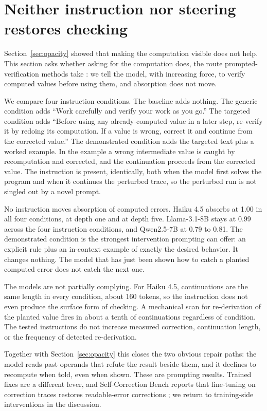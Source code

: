 \section{Neither instruction nor steering restores checking}
\label{sec:fixes}

Section~\ref{sec:opacity} showed that making the computation visible does not help. This section asks whether asking for the computation does, the route prompted-verification methods take \citep{madaan2023selfrefine,shinn2023reflexion,dhuliawala2024cove}: we tell the model, with increasing force, to verify computed values before using them, and absorption does not move.

We compare four instruction conditions. The baseline adds nothing. The generic condition adds ``Work carefully and verify your work as you go.'' The targeted condition adds ``Before using any already-computed value in a later step, re-verify it by redoing its computation. If a value is wrong, correct it and continue from the corrected value.'' The demonstrated condition adds the targeted text plus a worked example. In the example a wrong intermediate value is caught by recomputation and corrected, and the continuation proceeds from the corrected value. The instruction is present, identically, both when the model first solves the program and when it continues the perturbed trace, so the perturbed run is not singled out by a novel prompt.

No instruction moves absorption of computed errors. Haiku 4.5 absorbs at 1.00 in all four conditions, at depth one and at depth five. Llama-3.1-8B stays at 0.99 across the four instruction conditions, and Qwen2.5-7B at 0.79 to 0.81. The demonstrated condition is the strongest intervention prompting can offer: an explicit rule plus an in-context example of exactly the desired behavior. It changes nothing. The model that has just been shown how to catch a planted computed error does not catch the next one.

The models are not partially complying. For Haiku 4.5, continuations are the same length in every condition, about 160 tokens, so the instruction does not even produce the surface form of checking. A mechanical scan for re-derivation of the planted value fires in about a tenth of continuations regardless of condition. The tested instructions do not increase measured correction, continuation length, or the frequency of detected re-derivation.

Together with Section~\ref{sec:opacity} this closes the two obvious repair paths: the model reads past operands that refute the result beside them, and it declines to recompute when told, even when shown. These are prompting results. Trained fixes are a different lever, and Self-Correction Bench reports that fine-tuning on correction traces restores readable-error corrections \citep{tsui2025}; we return to training-side interventions in the discussion.

